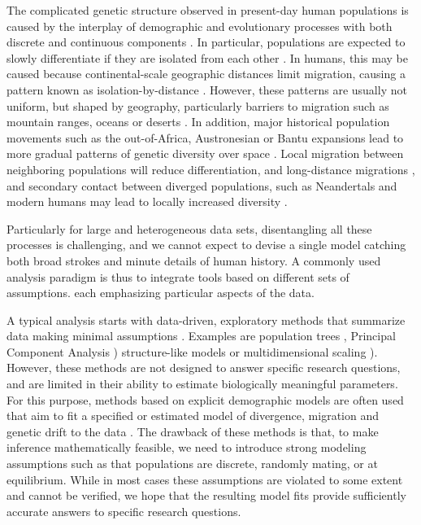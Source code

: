 \documentclass[12pt,fullpage, a4paper]{article}
\begin{document}
The complicated genetic structure observed in present-day human populations \citep{the2015, mallick2016} is caused by the interplay of demographic and evolutionary processes with both discrete and continuous components \citep{pritchard2000, rosenberg2002a, serre2004, rosenberg2005, bradburd2018, reich2018a, peter2020a}.
In particular, populations are expected to slowly differentiate if they are isolated from each other \citep{wahlund1928,cavalli-sforza1975}. In humans, this may be caused because continental-scale geographic distances limit migration, causing a pattern known as isolation-by-distance \citep{slatkin1985}. However, these patterns are usually not uniform, but shaped by geography, particularly barriers  to migration such as mountain ranges, oceans or deserts \citep{cavalli-sforza1994, barbujani1990, rosenberg2005, bradburd2013, peter2020a}. In addition,  major historical population movements such as the out-of-Africa, Austronesian or Bantu expansions lead to more gradual patterns of genetic diversity over space \citep{cavalli-sforza1994, ramachandran2005, novembre2008, stoneking2016, racimo2020}. Local migration between neighboring populations will reduce differentiation, and long-distance migrations \citep{alves2016}, and secondary contact between diverged populations, such as Neandertals and modern humans \citep{green2010} may lead to locally increased diversity \citep{skov2018}.

Particularly for large and heterogeneous data sets, disentangling all these processes is challenging, and we cannot expect to devise a single model catching both broad strokes and minute details of human history. A commonly used analysis paradigm is thus to integrate tools based on different sets of assumptions. each emphasizing particular aspects of the data.

A typical analysis starts with data-driven, exploratory methods that summarize data making minimal assumptions \citep[e.g.][]{schraiber2015}. Examples are population trees \citep{cavalli-sforza1967, felsenstein1973, cavalli-sforza1975}, Principal Component Analysis \citep[PCA, ][]{cavalli-sforza1994, patterson2006}) structure-like models \citep{pritchard2000, alexander2009} or multidimensional scaling \citep[MDS][]{lessa1990}). However, these methods are not designed to answer specific research questions, and are limited in their ability to estimate biologically meaningful parameters. For this purpose, methods based on explicit demographic models are often used that aim to fit a specified or estimated model of divergence, migration and genetic drift to the data \citep{gutenkunst2009, excoffier2013, kamm2015}. The drawback of these methods is that, to make inference mathematically feasible, we need to introduce strong modeling assumptions such as that populations are discrete, randomly mating, or at equilibrium. While in most cases these assumptions are violated to some extent and cannot be verified, we hope that the resulting model fits provide sufficiently accurate answers to specific research questions.
\end{document}
